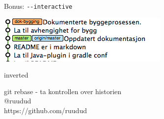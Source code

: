 \documentclass{beamer}
\begin{document}
\begin{frame}{Bonus: \texttt{-{}-interactive}}
    \begin{center}
        \includegraphics[scale=0.7]{7.png}
    \end{center}
\end{frame}

\begin{frame}
    \begin{beamercolorbox}[ignorebg]{inverted}
    \begin{center}
        \Huge{git rebase - ta kontrollen over historien}\\
        \vspace{1cm}
        \large{@ruudud \\ https://github.com/ruudud}
    \end{center}
    \end{beamercolorbox}%
\end{frame}
\end{document}
